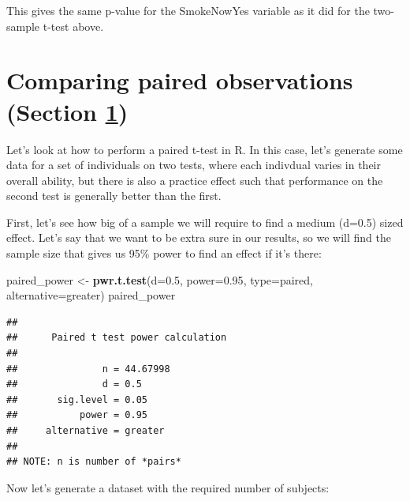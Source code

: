 \documentclass[
  12pt,
]{book}
\newenvironment{Shaded}{\begin{snugshade}}{\end{snugshade}}
\newcommand{\AttributeTok}[1]{\textcolor[rgb]{0.13,0.29,0.53}{#1}}
\newcommand{\FloatTok}[1]{\textcolor[rgb]{0.00,0.00,0.81}{#1}}
\newcommand{\FunctionTok}[1]{\textcolor[rgb]{0.13,0.29,0.53}{\textbf{#1}}}
\newcommand{\NormalTok}[1]{#1}
\newcommand{\OtherTok}[1]{\textcolor[rgb]{0.56,0.35,0.01}{#1}}
\newcommand{\StringTok}[1]{\textcolor[rgb]{0.31,0.60,0.02}{#1}}
\begin{document}
This gives the same p-value for the SmokeNowYes variable as it did for the two-sample t-test above.

\hypertarget{paired-ttests}{%
\section{Comparing paired observations (Section \ref{paired-ttests})}\label{paired-ttests}}

Let's look at how to perform a paired t-test in R. In this case, let's generate some data for a set of individuals on two tests, where each indivdual varies in their overall ability, but there is also a practice effect such that performance on the second test is generally better than the first.

First, let's see how big of a sample we will require to find a medium (d=0.5) sized effect. Let's say that we want to be extra sure in our results, so we will find the sample size that gives us 95\% power to find an effect if it's there:

\begin{Shaded}
\begin{Highlighting}[]
\NormalTok{paired\_power }\OtherTok{\textless{}{-}} \FunctionTok{pwr.t.test}\NormalTok{(}\AttributeTok{d=}\FloatTok{0.5}\NormalTok{, }\AttributeTok{power=}\FloatTok{0.95}\NormalTok{, }\AttributeTok{type=}\StringTok{\textquotesingle{}paired\textquotesingle{}}\NormalTok{, }\AttributeTok{alternative=}\StringTok{\textquotesingle{}greater\textquotesingle{}}\NormalTok{)}
\NormalTok{paired\_power}
\end{Highlighting}
\end{Shaded}

\begin{verbatim}
## 
##      Paired t test power calculation 
## 
##               n = 44.67998
##               d = 0.5
##       sig.level = 0.05
##           power = 0.95
##     alternative = greater
## 
## NOTE: n is number of *pairs*
\end{verbatim}

Now let's generate a dataset with the required number of subjects:
\end{document}
